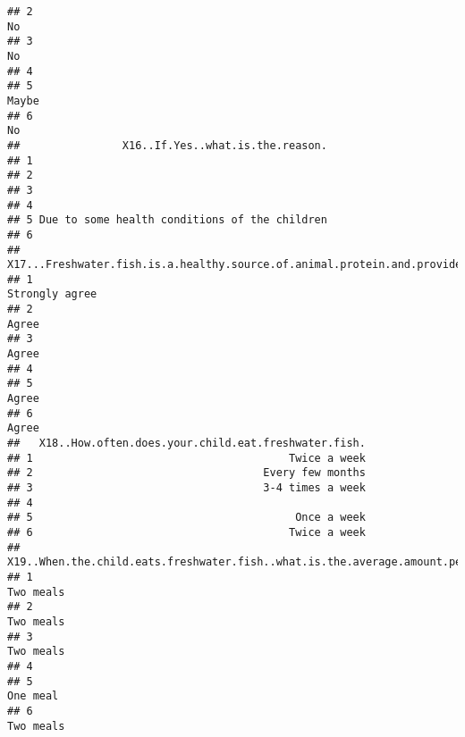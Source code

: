 \documentclass[
]{article}
\begin{document}
\begin{verbatim}
## 2                                                                                     No
## 3                                                                                     No
## 4                                                                                       
## 5                                                                                  Maybe
## 6                                                                                     No
##                X16..If.Yes..what.is.the.reason.
## 1                                              
## 2                                              
## 3                                              
## 4                                              
## 5 Due to some health conditions of the children
## 6                                              
##   X17...Freshwater.fish.is.a.healthy.source.of.animal.protein.and.provide.other.important.nutrients.for.children..
## 1                                                                                                   Strongly agree
## 2                                                                                                            Agree
## 3                                                                                                            Agree
## 4                                                                                                                 
## 5                                                                                                            Agree
## 6                                                                                                            Agree
##   X18..How.often.does.your.child.eat.freshwater.fish.
## 1                                        Twice a week
## 2                                    Every few months
## 3                                    3-4 times a week
## 4                                                    
## 5                                         Once a week
## 6                                        Twice a week
##   X19..When.the.child.eats.freshwater.fish..what.is.the.average.amount.per.day.
## 1                                                                     Two meals
## 2                                                                     Two meals
## 3                                                                     Two meals
## 4                                                                              
## 5                                                                      One meal
## 6                                                                     Two meals

\end{verbatim}
\end{document}
